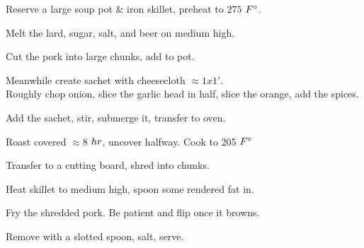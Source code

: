 \begin{preparation}
\item Reserve a large soup pot \& iron skillet, preheat to $275$ $\Fahrenheit$.
\item Melt the lard, sugar, salt, and beer on medium high.
\item Cut the pork into large chunks, add to pot.
\item Meanwhile create sachet with cheesecloth $\approx1x1'$.\\
    Roughly chop onion, slice the garlic head in half, slice the orange, add the spices.
\item Add the sachet, stir, submerge it, transfer to oven.
\item Roast covered $\approx8$ $\hour$, uncover halfway.
    Cook to 205 $\Fahrenheit$
\item Transfer to a cutting board, shred into chunks.
\item Heat skillet to medium high, spoon some rendered fat in.
\item Fry the shredded pork. Be patient and flip once it browns.
\item Remove with a slotted spoon, salt, serve.
\end{preparation}


\recipeend%
